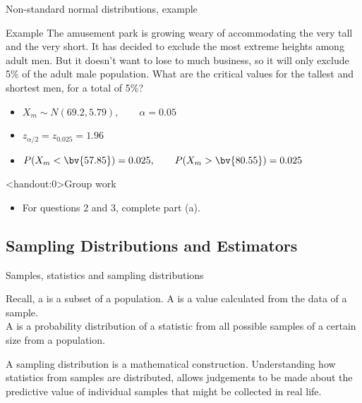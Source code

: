 \documentclass[xcolor=table]{beamer}
\begin{document}
\begin{frame}{Non-standard normal distributions, example}
\begin{exampleblock}{Example}
The amusement park is growing weary of accommodating the very tall and the very short. It has decided to exclude the most extreme heights among adult men. But it doesn't want to lose to much business, so it will only exclude 5\% of the adult male population. What are the critical values for the tallest and shortest men, for a total of 5\%?
\begin{itemize} 
\pause\item $X_m \sim N(69.2, 5.79), \qquad \alpha = 0.05$
\pause\item $z_{\alpha/2} = z_{0.025} = 1.96$
\pause\item $P(X_m <  \bv{57.85}) = 0.025, \qquad P(X_m >  \bv{80.55}) = 0.025$
\end{itemize}

\end{exampleblock}
\end{frame}

\begin{frame}<handout:0>{Group work}
\begin{block}{}
\large
\begin{itemize}
\item For questions 2 and 3, complete part (a).
\end{itemize}
\end{block}
\end{frame}

\subsection{Sampling Distributions and Estimators}

\begin{frame}{Samples, statistics and sampling distributions}
\begin{block}{}
\large Recall, a  is a subset of a population. A  is a value calculated from the data of a sample.\\
\medskip
A  is a probability distribution of a statistic from all possible samples of a certain size from a population.
\end{block}

\pause
\begin{block}{}
\large
A sampling distribution is a mathematical construction. Understanding how statistics from samples are distributed, allows judgements to be made about the predictive value of individual samples that might be collected in real life.
\end{block}
\end{frame}
\end{document}
